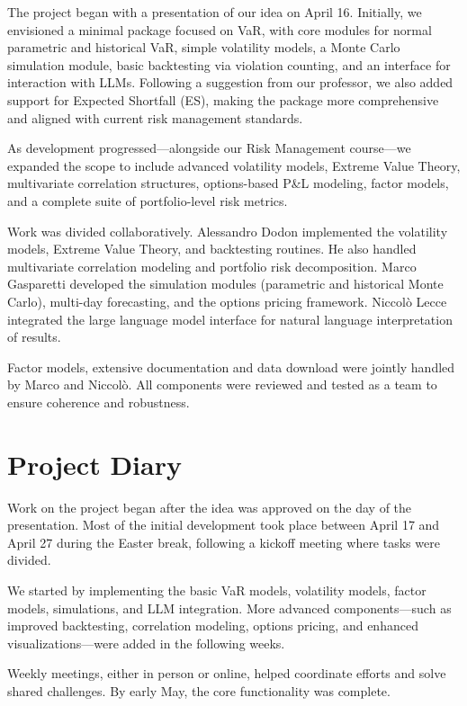 \documentclass{article}
\begin{document}
The project began with a presentation of our idea on April 16. Initially, we envisioned a minimal package focused on VaR, with core modules for normal parametric and historical VaR, simple volatility models, a Monte Carlo simulation module, basic backtesting via violation counting, and an interface for interaction with LLMs. Following a suggestion from our professor, we also added support for Expected Shortfall (ES), making the package more comprehensive and aligned with current risk management standards.

As development progressed—alongside our Risk Management course—we expanded the scope to include advanced volatility models, Extreme Value Theory, multivariate correlation structures, options-based P\&L modeling, factor models, and a complete suite of portfolio-level risk metrics.

Work was divided collaboratively. Alessandro Dodon implemented the volatility models, Extreme Value Theory, and backtesting routines. He also handled multivariate correlation modeling and portfolio risk decomposition. Marco Gasparetti developed the simulation modules (parametric and historical Monte Carlo), multi-day forecasting, and the options pricing framework. Niccolò Lecce integrated the large language model interface for natural language interpretation of results.

Factor models, extensive documentation and data download were jointly handled by Marco and Niccolò. All components were reviewed and tested as a team to ensure coherence and robustness.


\section{Project Diary}

Work on the project began after the idea was approved on the day of the presentation. Most of the initial development took place between April 17 and April 27 during the Easter break, following a kickoff meeting where tasks were divided.

We started by implementing the basic VaR models, volatility models, factor models, simulations, and LLM integration. More advanced components—such as improved backtesting, correlation modeling, options pricing, and enhanced visualizations—were added in the following weeks.

Weekly meetings, either in person or online, helped coordinate efforts and solve shared challenges. By early May, the core functionality was complete.
\end{document}
